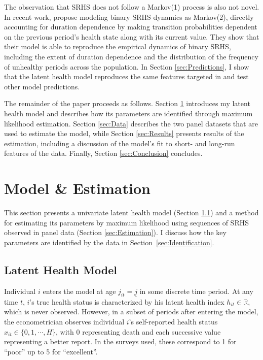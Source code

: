 \documentclass[12pt,pdftex,letterpaper]{article}
\newcommand{\R}{\mathbb{R}}
\newcommand{\Health}{h}
\newcommand{\TopHealth}{H}
\newcommand{\Report}{x}
\newcommand{\Age}{j}
\newcommand{\AgeMin}{\underline{\Age}}
\begin{document}
The observation that SRHS does not follow a Markov(1) process is also not novel.  In recent work, \cite{DeNardi18} propose modeling binary SRHS dynamics as Markov(2), directly accounting for duration dependence by making transition probabilities dependent on the previous period's health state along with its current value. They show that their model is able to reproduce the empirical dynamics of binary SRHS, including the extent of duration dependence and the distribution of the frequency of unhealthy periods across the population.  In Section \ref{sec:Predictions}, I show that the latent health model reproduces the same features targeted in \cite{DeNardi18} and test other model predictions.

The remainder of the paper proceeds as follows.  Section \ref{sec:ModelAndEst} introduces my latent health model and describes how its parameters are identified through maximum likelihood estimation.  Section \ref{sec:Data} describes the two panel datasets that are used to estimate the model, while Section \ref{sec:Results} presents results of the estimation, including a discussion of the model's fit to short- and long-run features of the data. Finally, Section \ref{sec:Conclusion} concludes.


\section{Model \& Estimation}\label{sec:ModelAndEst}

This section presents a univariate latent health model (Section \ref{sec:Model}) and a method for estimating its parameters by maximum likelihood using sequences of SRHS observed in panel data (Section \ref{sec:Estimation}). I discuss how the key parameters are identified by the data in Section~\ref{sec:Identification}.

\subsection{Latent Health Model}\label{sec:Model}

Individual $i$ enters the model at age $\Age_{it}=\AgeMin$ in some discrete time period.  At any time $t$, $i$'s true health status is characterized by his latent health index  $\Health_{it} \in \R$, which is never observed.  However, in a subset of periods after entering the model, the econometrician observes individual $i$'s self-reported health status $\Report_{it} \in \{0,1,\cdots,\TopHealth\}$, with $0$ representing death and each successive value representing a better report.  In the surveys used, these correspond to 1 for ``poor'' up to 5 for ``excellent''.
\end{document}
